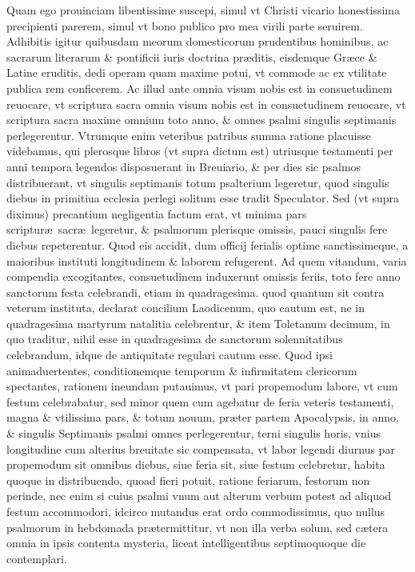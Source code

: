\documentclass[a5paper,10pt]{book}
\def\ae{æ}
\begin{document}
Quam ego prouinciam libentissime suscepi, simul vt Christi vicario honestissima precipienti parerem, simul vt bono publico pro mea virili parte seruirem.
Adhibitis igitur quibusdam meorum domesticorum prudentibus hominibus, ac sacrarum literarum \& pontificii iuris doctrina pr\ae ditis, eisdemque Gr\ae ce \& Latine eruditis, dedi operam quam %
maxime potui, vt commode ac ex vtilitate publica rem conficerem.
Ac illud ante omnia visum nobis est in consuetudinem reuocare, vt scriptura sacra omnia visum nobis est in consuetudinem reuocare, vt scriptura sacra maxime omnium toto anno, \& omnes %
psalmi singulis septimanis perlegerentur.%
Vtrumque enim veteribus patribus summa ratione placuisse videbamus, qui plerosque libros (vt supra dictum est) utriusque testamenti per anni tempora legendos disposuerant in Breuiario, \& per dies sic psalmos distribuerant, vt singulis septimanis
totum psalterium legeretur, quod singulis diebus in primitiua ecclesia perlegi solitum esse tradit Speculator.
Sed (vt supra diximus) precantium negligentia factum erat, vt minima pars scriptur\ae \ sacr\ae \ legeretur, \& psalmorum plerisque omissis, pauci singulis fere diebus repeterentur.
Quod eis accidit, dum officij ferialis optime sanctissimeque, a maioribus instituti longitudinem \& laborem refugerent.
Ad quem vitandum, varia compendia excogitantes, consuetudinem induxerunt omissis feriis, toto fere anno sanctorum %
festa celebrandi, etiam in quadragesima.
quod %
quantum sit contra veterum instituta, declarat concilium Laodicenum, quo cautum est, ne in quadragesima martyrum natalitia celebrentur, \& item Toletanum decimum, in quo traditur, nihil esse in quadragesima de sanctorum %
solennitatibus %
celebrandum, idque de antiquitate regulari cautum esse.
Quod ipsi animaduertentes, conditionemque temporum \& infirmitatem clericorum spectantes, rationem ineundam putauimus, vt pari propemodum labore, vt cum festum celebrabatur, sed minor quem %
cum agebatur de feria veteris testamenti, magna \& vtilissima pars, \& totum nouum, pr\ae ter partem Apocalypsis, in anno, \& singulis Septimanis psalmi omnes perlegerentur, terni singulis horis, vnius longitudine cum alterius breuitate sic compensata, vt labor legendi diurnus par propemodum sit omnibus diebus, siue feria sit, siue festum celebretur, habita quoque in distribuendo, quoad fieri potuit, ratione feriarum, festorum non perinde, nec enim si cuius psalmi vnum aut alterum verbum potest ad aliquod festum accommodori, idcirco mutandus erat ordo commodissimus, quo nullus psalmorum in hebdomada pr\ae termittitur, vt non illa verba solum, sed c\ae tera omnia in ipsis contenta mysteria, liceat intelligentibus septimoquoque die contemplari.
\end{document}
